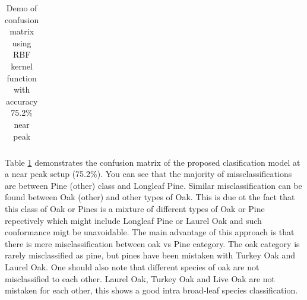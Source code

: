 \documentclass[remotesensing,article,accept,moreauthors,pdftex,12pt,a4paper]{mdpi}
\begin{document}
\begin{table}[t]
\begin{center}
{\begin{tabular}{lllllllll|}
\end{tabular}
}
 \caption{Demo of confusion matrix using RBF kernel function with accuracy 75.2\% near peak}
    \label{table:confusion matrix}\end{center}
    
\end{table}

Table \ref{table:confusion matrix} demonstrates the confusion matrix of the proposed clasification model at a near peak setup (75.2\%). 
You can see that the majority of missclassifications are between Pine (other) class and Longleaf Pine. 
Similar misclassification can be found between Oak (other) and other types of Oak. 
This is due ot the fact that this class of Oak or Pines is a mixture of different types of Oak or Pine repectively which might include Longleaf Pine or Laurel Oak and such conformance migt be unavoidable. 
The main advantage of this approach is that there is mere misclassification between oak vs Pine category.
The oak category is rarely misclassified as pine, but pines have been mistaken with Turkey Oak and Laurel Oak. 
One should also note that different species of oak are not misclassified to each other. 
Laurel Oak, Turkey Oak and Live Oak are not mistaken for each other, this shows a good intra broad-leaf species classification.  










\end{document}

